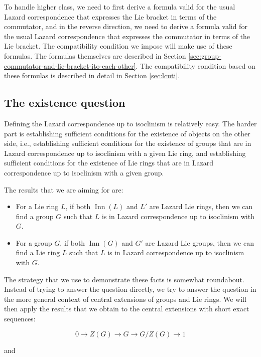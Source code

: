 \documentclass{ucetd}
\begin{document}
To handle higher class, we need to first derive a formula valid for
the usual Lazard correspondence that expresses the Lie bracket in
terms of the commutator, and in the reverse direction, we need to
derive a formula valid for the usual Lazard correspondence that
expresses the commutator in terms of the Lie bracket. The
compatibility condition we impose will make use of these formulas. The
formulas themselves are described in Section
\ref{sec:group-commutator-and-lie-bracket-ito-each-other}. The
compatibility condition based on these formulas is described in detail
in Section \ref{sec:lcuti}.

\subsection{The existence question}\label{sec:existence-question}

Defining the Lazard correspondence up to isoclinism is relatively
easy. The harder part is establishing sufficient conditions for the
existence of objects on the other side, i.e., establishing sufficient
conditions for the existence of groups that are in Lazard
correspondence up to isoclinism with a given Lie ring, and
establishing sufficient conditions for the existence of Lie rings that
are in Lazard correspondence up to isoclinism with a given group.

The results that we are aiming for are:

\begin{itemize}

\item For a Lie ring $L$, if both $\operatorname{Inn}(L)$ and $L'$ are
  Lazard Lie rings, then we can find a group $G$ such that $L$ is in
  Lazard correspondence up to isoclinism with $G$.
\item For a group $G$, if both $\operatorname{Inn}(G)$ and $G'$ are
  Lazard Lie groups, then we can find a Lie ring $L$ such that $L$ is
  in Lazard correspondence up to isoclinism with $G$.
\end{itemize}

The strategy that we use to demonstrate these facts is somewhat
roundabout. Instead of trying to answer the question directly, we try
to answer the question in the more general context of central
extensions of groups and Lie rings. We will then apply the results
that we obtain to the central extensions with short exact sequences:

$$0 \to Z(G) \to G \to G/Z(G) \to 1$$

and
\end{document}
